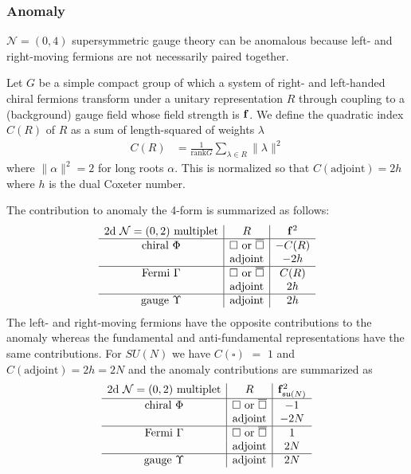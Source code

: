 \documentclass{article}
\numberwithin{equation}{section}
\begin{document}
\subsubsection{Anomaly}
\label{sec_04anomaly}
$\mathcal{N}=(0,4)$ supersymmetric gauge theory can be anomalous  
because left- and right-moving fermions are not necessarily paired together. 


Let $G$ be a simple compact group of which a system of right- and left-handed chiral fermions 
transform under a unitary representation $R$ 
through coupling to a (background) gauge field whose field strength is ${\bf f}$. 
We define the quadratic index $C(R)$ of $R$ as 
a sum of length-squared of weights $\lambda$
\begin{align}
\label{quadratic_index}
C(R)&=\frac{1}{\mathrm{rank} G}\sum_{\lambda\in R}
\|\lambda \|^{2}
\end{align}
where $\|\alpha \|^{2}=2$ for long roots $\alpha$. 
This is normalized so that $C(\textrm{adjoint})=2h$ 
where $h$ is the dual Coxeter number. 


The contribution to anomaly the 4-form is summarized as follows:
\begin{align}
\label{t_Anom}
\begin{array}{c|c|c}
\textrm{2d $\mathcal{N}=(0,2)$ multiplet}&\textrm{$R$}&{\bf f}^2 \\  \hline 
\textrm{chiral $\Phi$}&\textrm{$\Box$ or $\overline{\Box}$} &-C(R) \\
& \textrm{adjoint}& -2h\\ \hline
\textrm{Fermi $\Gamma$}&\textrm{$\Box$ or $\overline{\Box}$}& C(R) \\ 
&\textrm{adjoint}& 2h\\ \hline
\textrm{gauge $\Upsilon$}&\textrm{adjoint}& 2h\\
\end{array}
\end{align}
The left- and right-moving fermions have the opposite contributions to the anomaly 
whereas the fundamental and anti-fundamental representations have the same contributions. 
For $SU(N)$ we have $C(\square)$ $=$ $1$ 
and $C(\textrm{adjoint})=2h=2N$ 
and the anomaly contributions are summarized as 
\begin{align}
\label{t_Anom2a}
\begin{array}{c|c|c}
\textrm{2d $\mathcal{N}=(0,2)$ multiplet}&R&{\bf f}_{\mathfrak{su}(N)}^2 \\  \hline 
\textrm{chiral $\Phi$}&\textrm{$\Box$ or $\overline{\Box}$} &-1 \\
& \textrm{adjoint}& -2N\\ \hline
\textrm{Fermi $\Gamma$}&\textrm{$\Box$ or $\overline{\Box}$}& 1 \\ 
&\textrm{adjoint}& 2N\\ \hline
\textrm{gauge $\Upsilon$}&\textrm{adjoint}& 2N\\
\end{array}
\end{align}
\end{document}
